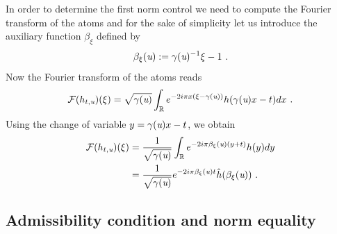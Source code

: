 In order to determine the first norm control we need to compute the Fourier transform of the atoms and for the sake of simplicity let us introduce the auxiliary function $\beta_\xi$ defined by
\begin{equation}
\label{fo:def.beta}
\beta_\xi(\textit{u}):=\gamma(\textit{u})^{-1}\xi-1\ .
\end{equation}
Now the Fourier transform of the atoms reads
\begin{equation}
	\mathcal{F}(h_{t,\textit{u}})(\xi) = \sqrt{\gamma(\textit{u})}\int_{\mathbb{R}} e^{-2i\pi x (\xi-\gamma(\textit{u}))}h(\gamma(\textit{u})x-t) dx\ .
\end{equation}
Using the change of variable $y=\gamma(\textit{u})x-t$, we obtain
\begin{align}
	\F(h_{t,\u})(\xi) &= \frac{1}{\sqrt{\gamma(\u)}}\int_\R e^{-2i\pi \beta_\xi(\u)(y+t)}h(y)dy \\
	& = \frac{1}{\sqrt{\gamma(\u)}}e^{-2i\pi\beta_\xi(\u)t}\hat{h}(\beta_\xi(\u))\ .
\end{align}


\subsection{Admissibility condition and norm equality}

